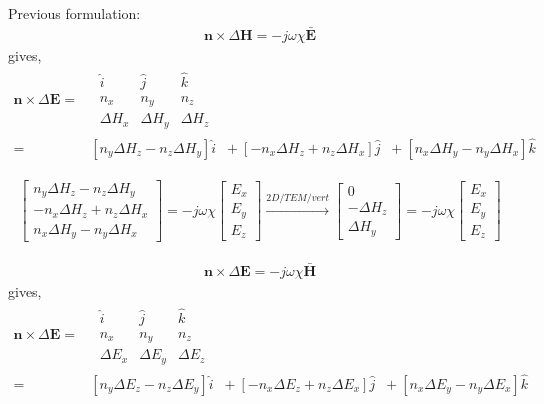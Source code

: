 \documentclass{article}
\newcommand{\E}{\mathbf{E}}
\renewcommand{\H}{\mathbf{H}}
\newcommand{\Hb}{\mathbf{\bar H}}
\newcommand{\Eb}{\mathbf{\bar E}}
\newcommand{\n}{\mathbf{n}}
\newcommand{\DE}{\Delta \E}
\newcommand{\dE}{\Delta E}
\newcommand{\dH}{\Delta H}
\renewcommand{\H}{\mathbf{H}}
\newcommand{\0}{\varnothing}
\begin{document}
Previous formulation:
\begin{align*}
    \n \times \Delta \H = -j \omega \chi\Eb
\end{align*}
gives,
\begin{align*}
    \n \times \DE = &\;\begin{array}{|ccc|}
    \hat i & \hat j & \hat k\\
    n_x & n_y & n_z     \\
     \dH_x& \dH_y & \dH_z
    \end{array}\\
     = &\left[n_y \dH_z - n_z \dH_y \right] \hat i \;\; + 
       \left[-n_x \dH_z + n_z \dH_x\right] \hat j \;\; + 
       \left[n_x \dH_y - n_y \dH_x\right] \hat k
\end{align*}

\begin{align*}
    \left[
    \begin{array}{c}
    n_y \dH_z - n_z \dH_y\\ 
    -n_x \dH_z + n_z \dH_x\\
    n_x \dH_y - n_y \dH_x
    \end{array} \right] = 
    -j \omega \chi 
    \left[
    \begin{array}{c}
     E_x\\
     E_y\\
     E_z
     \end{array} \right]
     \xrightarrow{2D/TEM/vert}
    \left[
    \begin{array}{c}
    0\\ 
    -\dH_z\\
    \dH_y
    \end{array} \right] = 
    -j \omega \chi 
    \left[
    \begin{array}{c}
     E_x\\
     E_y\\
     E_z
     \end{array} \right]
\end{align*}

\begin{align*}
    \n \times \Delta \E = -j \omega \chi\Hb
\end{align*}
gives,
\begin{align*}
    \n \times \DE = &\;\begin{array}{|ccc|}
    \hat i & \hat j & \hat k\\
    n_x & n_y & n_z     \\
     \dE_x& \dE_y & \dE_z
    \end{array}\\
     = &\left[n_y \dE_z - n_z \dE_y \right] \hat i \;\; + 
       \left[-n_x \dE_z + n_z \dE_x\right] \hat j \;\; + 
       \left[n_x \dE_y - n_y \dE_x\right] \hat k
\end{align*}
\end{document}
